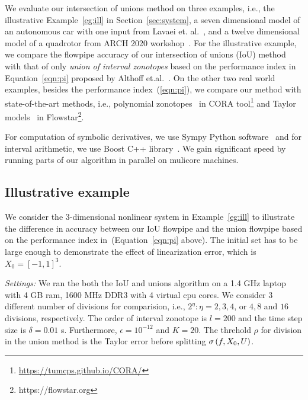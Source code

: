 We evaluate our intersection of unions method on three examples, i.e.,
the illustrative Example~\ref{eg:ill} in Section~\ref{sec:system}, a
seven dimensional model of an autonomous car with one input from Lavaei
et. al.~\cite{lavaei2020formal}, and a twelve dimensional model of a quadrotor
from ARCH 2020 workshop~\cite{geretti2020arch}.  For the illustrative
example, we compare the flowpipe accuracy of our intersection of
unions (IoU) method with that of only
\emph{union of interval zonotopes} based on the performance index in
Equation~\ref{eqn:pi} proposed by Althoff
et.al.~\cite{althoff2008reachability}.  
On the other two real world
examples, besides the performance index~(\ref{eqn:pi}), we compare our
method with state-of-the-art methods, i.e., polynomial
zonotopes~\cite{althoff2013reachability} in CORA
tool\footnote{\url{https://tumcps.github.io/CORA/}} and Taylor
models~\cite{chen2012taylor} in
Flowstar\footnote{https://flowstar.org}.


For computation of symbolic derivatives, we use Sympy Python
software~\cite{10.7717/peerj-cs.103} and for interval arithmetic, we
use Boost C++ library~\cite{bronnimann2006design}.  We gain
significant speed by running parts of our algorithm in
parallel on mulicore machines.

\subsection{Illustrative example}
We consider the 3-dimensional nonlinear system in Example~\ref{eg:ill}
to illustrate the difference in accuracy between our IoU flowpipe and
the union flowpipe based on the performance index
in~\cite{althoff2008reachability}(Equation~\ref{eqn:pi} above).  The
initial set has to be large enough to demonstrate the effect of linearization error, which is $X_0 = [-1,1]^3$.

\emph{Settings:}  We ran the both the IoU and unions algorithm on a 1.4 GHz
laptop with 4 GB ram, 1600 MHz DDR3 with 4 virtual cpu cores.  We
consider 3 different number of divisions for comparision, i.e.,
$2^\eta:\eta = 2, 3,4$, or $4, 8$ and $16$ divisions,
respectively. The order of interval zonotope is $l = 200$ and the time
step size is $\delta = 0.01$ s.  Furthermore, $\epsilon = 10^{-12}$
and $K = 20$.  The threhold $\rho$ for division in the union method is
the Taylor error before splitting $\sigma\left(f,X_0,U\right)$.

